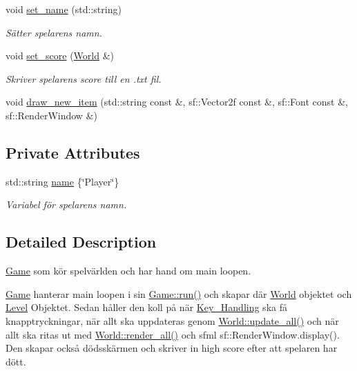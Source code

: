 \begin{DoxyCompactItemize}
void \hyperlink{classGame_a7dd41abdb2a4d0c72f328e1035b2cd06}{set\+\_\+name} (std\+::string)
\begin{DoxyCompactList}\small\item\em Sätter spelarens namn. \end{DoxyCompactList}\item 
void \hyperlink{classGame_a0626eca623682fa3f6b925656e790214}{set\+\_\+score} (\hyperlink{classWorld}{World} \&)
\begin{DoxyCompactList}\small\item\em Skriver spelarens score till en .txt fil. \end{DoxyCompactList}\item 
void \hyperlink{classGame_ad0c6cacf0ac2063f5e0e169a46adcdb7}{draw\+\_\+new\+\_\+item} (std\+::string const \&, sf\+::\+Vector2f const \&, sf\+::\+Font const \&, sf\+::\+Render\+Window \&)
\end{DoxyCompactItemize}
\subsection*{Private Attributes}
\begin{DoxyCompactItemize}
\item 
std\+::string \hyperlink{classGame_a7f9c64d3f7fd7694c544b4c68d72569d}{name} \{\char`\"{}Player\char`\"{}\}
\begin{DoxyCompactList}\small\item\em Variabel för spelarens namn. \end{DoxyCompactList}\end{DoxyCompactItemize}


\subsection{Detailed Description}
\hyperlink{classGame}{Game} som kör spelvärlden och har hand om main loopen. 

\hyperlink{classGame}{Game} hanterar main loopen i sin \hyperlink{classGame_aedc2d87ef2e375e019c4c6f3d47da429}{Game\+::run()} och skapar där \hyperlink{classWorld}{World} objektet och \hyperlink{classLevel}{Level} Objektet. Sedan håller den koll på när \hyperlink{classKey__Handling}{Key\+\_\+\+Handling} ska få knapptryckningar, när allt ska uppdateras genom \hyperlink{classWorld_abe8efb7955edd02cfdae5f99f2e5a346}{World\+::update\+\_\+all()} och när allt ska ritas ut med \hyperlink{classWorld_a56d3640e46fef8b3e62538f067e2fbd2}{World\+::render\+\_\+all()} och sfml sf\+::\+Render\+Window.\+display(). Den skapar också dödsskärmen och skriver in high score efter att spelaren har dött. 

